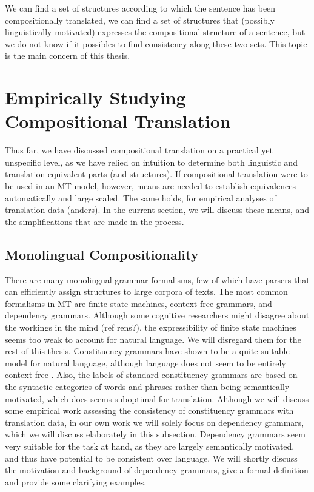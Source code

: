 \documentclass{report}
\theoremstyle{break}
\begin{document}
We can find a set of structures according to which the sentence has been compositionally translated, we can find a set of structures that (possibly linguistically motivated) expresses the compositional structure of a sentence, but we do not know if it possibles to find consistency along these two sets. This topic is the main concern of this thesis.

\section{Empirically Studying Compositional Translation}

Thus far, we have discussed compositional translation on a practical yet unspecific level, as we have relied on intuition to determine both linguistic and translation equivalent parts (and structures). If compositional translation were to be used in an MT-model, however, means are needed to establish equivalences automatically and large scaled. The same holds, for empirical analyses of translation data (anders). In the current section, we will discuss these means, and the simplifications that are made in the process.

\subsection{Monolingual Compositionality}
\label{sec:depgram}

There are many monolingual grammar formalisms, few of which have parsers that can efficiently assign structures to large corpora of texts. The most common formalisms in MT are finite state machines, context free grammars, and dependency grammars. Although some cognitive researchers might disagree about the workings in the mind (ref rens?), the expressibility of finite state machines seems too weak to account for natural language. We will disregard them for the rest of this thesis. Constituency grammars have shown to be a quite suitable model for natural language, although language does not seem to be entirely context free \citep{shieber1987evidence}. Also, the labels of standard constituency grammars are based on the syntactic categories of words and phrases rather than being semantically motivated, which does seems suboptimal for translation. Although we will discuss some empirical work assessing the consistency of constituency grammars with translation data, in our own work we will solely focus on dependency grammars, which we will discuss elaborately in this subsection. Dependency grammars seem very suitable for the task at hand, as they are largely semantically motivated, and thus have potential to be consistent over language. We will shortly discuss the motivation and background of dependency grammars, give a formal definition and provide some clarifying examples.
\end{document}
